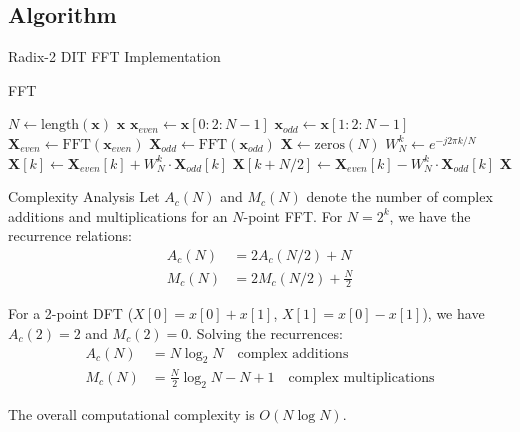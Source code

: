 \documentclass[10pt]{beamer}
\begin{document}
\subsection{Algorithm}
\begin{frame}[fragile]{Radix-2 DIT FFT Implementation}
\begin{algorithm}[H]
\caption{FFT}
\begin{algorithmic}[1]
  \State \(N \gets \text{length}(\bm{x})\)
    \State \Return \(\bm{x}\) 
  \EndIf
  \State \(\bm{x}_{even} \gets \bm{x}[0:2:N-1]\) 
  \State \(\bm{x}_{odd} \gets \bm{x}[1:2:N-1]\) 
  \State \(\bm{X}_{even} \gets \text{FFT}(\bm{x}_{even})\) 
  \State \(\bm{X}_{odd} \gets \text{FFT}(\bm{x}_{odd})\) 
  \State \(\bm{X} \gets \text{zeros}(N)\) 
    \State \(W_N^k \gets e^{-j2\pi k/N}\) 
    \State \(\bm{X}[k] \gets \bm{X}_{even}[k] + W_N^k \cdot \bm{X}_{odd}[k]\) 
    \State \(\bm{X}[k+N/2] \gets \bm{X}_{even}[k] - W_N^k \cdot \bm{X}_{odd}[k]\) 
  \EndFor
  \State \Return \(\bm{X}\)
\EndFunction
\end{algorithmic}
\end{algorithm}
\end{frame}

\begin{frame}{Complexity Analysis}
  Let $A_c(N)$ and $M_c(N)$ denote the number of complex additions and multiplications for an $N$-point FFT.
  For $N = 2^k$, we have the recurrence relations:
  \begin{align*}
    A_c(N) &= 2 A_c(N/2) + N \\
    M_c(N) &= 2 M_c(N/2) + \frac{N}{2}
  \end{align*}
  
  For a 2-point DFT ($X[0] = x[0] + x[1]$, $X[1] = x[0] - x[1]$), we have $A_c(2) = 2$ and $M_c(2) = 0$. Solving the recurrences:
  \begin{align*}
    A_c(N) &= N \log_2 N \quad \text{complex additions} \\
    M_c(N) &= \frac{N}{2} \log_2 N - N + 1 \quad \text{complex multiplications}
  \end{align*}
  
  The overall computational complexity is $O(N \log N)$.
\end{frame}
\end{document}
